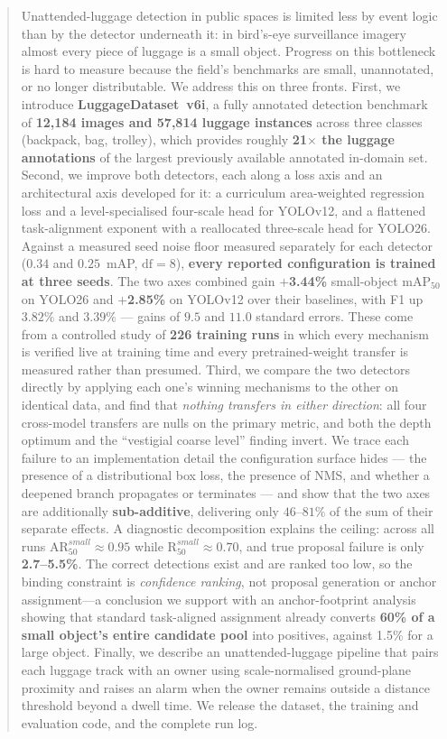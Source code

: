 \documentclass[10pt,twocolumn,a4paper]{article}
\begin{document}
\begin{@twocolumnfalse}
\begin{abstract}
\noindent\small
Unattended-luggage detection in public spaces is limited less by event logic than
by the detector underneath it: in bird's-eye surveillance imagery almost every
piece of luggage is a small object. Progress on this bottleneck is hard to
measure because the field's benchmarks are small, unannotated, or no longer
distributable. We address this on three fronts. First, we introduce
\textbf{LuggageDataset~v6i}, a fully annotated detection benchmark of
\textbf{12{,}184 images and 57{,}814 luggage instances} across three classes
(backpack, bag, trolley), which provides roughly \textbf{21$\times$ the luggage
annotations} of the largest previously available annotated in-domain set. Second,
we improve both detectors, each along a loss axis and an architectural axis
developed for it: a curriculum area-weighted regression loss and a
level-specialised four-scale head for YOLOv12, and a flattened task-alignment
exponent with a reallocated three-scale head for YOLO26. Against a measured seed
noise floor measured separately for each detector ($0.34$ and $0.25$~mAP,
$\mathrm{df}=8$), \textbf{every reported configuration is trained at three
seeds}. The two axes combined gain \textbf{$+$3.44\%} small-object mAP$_{50}$ on
YOLO26 and \textbf{$+$2.85\%} on YOLOv12 over their baselines, with F1 up
$3.82\%$ and $3.39\%$ --- gains of $9.5$ and $11.0$ standard errors. These come from a controlled study of \textbf{226 training runs} in
which every mechanism is verified live at training time and every
pretrained-weight transfer is measured rather than presumed. Third, we compare
the two detectors directly by applying each one's winning mechanisms to the
other on identical data, and find that \emph{nothing transfers in either
direction}: all four cross-model transfers are nulls on the primary metric, and
both the depth optimum and the ``vestigial coarse level'' finding invert. We
trace each failure to an implementation detail the configuration surface hides
--- the presence of a distributional box loss, the presence of NMS, and whether
a deepened branch propagates or terminates --- and show that the two axes are
additionally \textbf{sub-additive}, delivering only $46$--$81\%$ of the sum of
their separate effects. A diagnostic decomposition explains the ceiling: across all runs
$\mathrm{AR}_{50}^{small}\!\approx\!0.95$ while $\mathrm{R}_{50}^{small}\!\approx\!0.70$,
and true proposal failure is only \textbf{2.7--5.5\%}. The correct detections
exist and are ranked too low, so the binding constraint is \emph{confidence
ranking}, not proposal generation or anchor assignment---a conclusion we support
with an anchor-footprint analysis showing that standard task-aligned assignment
already converts \textbf{60\% of a small object's entire candidate pool} into
positives, against 1.5\% for a large object. Finally, we describe an
unattended-luggage pipeline that pairs each luggage track with an owner using
scale-normalised ground-plane proximity and raises an alarm when the owner
remains outside a distance threshold beyond a dwell time. We release the dataset,
the training and evaluation code, and the complete run log.
\end{abstract}


\end{@twocolumnfalse}
\end{document}
